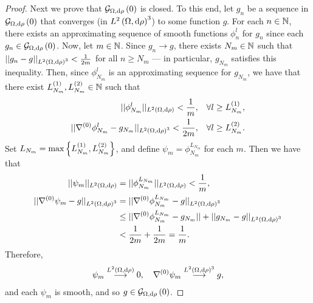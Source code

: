 \begin{proof}
	Next we prove that $\mathcal{G}_{ \Omega, \mathrm{d}\rho}\left( 0 \right)$ is closed.
	To this end, let $g_n$ be a sequence in $\mathcal{G}_{ \Omega, \mathrm{d}\rho}\left( 0 \right)$ that converges (in $L^{2}\left( \Omega,\mathrm{d}\rho \right)^3$) to some function $g$.
	For each $n\in\mathbb{N}$, there exists an approximating sequence of smooth functions $\phi_n^l$ for $g_n$ since each $g_n\in\mathcal{G}_{ \Omega, \mathrm{d}\rho}\left( 0 \right)$.
	Now, let $m\in\mathbb{N}$.
	Since $g_n\rightarrow g$, there exists $N_m\in\mathbb{N}$ such that $\lvert\lvert g_n-g \rvert\rvert_{L^{2}\left( \Omega,\mathrm{d}\rho \right)^3}<\frac{1}{2m}$ for all $n\geq N_m$ --- in particular, $g_{N_m}$ satisfies this inequality.
	Then, since $\phi_{N_m}^l$ is an approximating sequence for $g_{N_m}$, we have that there exist $L_{N_m}^{(1)}, L_{N_m}^{(2)}\in\mathbb{N}$ such that
	\begin{align*}
		\lvert\lvert \phi_{N_m}^l \rvert\rvert_{L^{2}\left( \Omega,\mathrm{d}\rho \right)} < \frac{1}{m}, &\quad\forall l\geq L_{N_m}^{(1)}, \\
		\lvert\lvert \nabla^{(0)}\phi_{N_m}^l - g_{N_m} \rvert\rvert_{L^{2}\left( \Omega,\mathrm{d}\rho \right)^3} < \frac{1}{2m}, &\quad\forall l\geq L_{N_m}^{(2)}.
	\end{align*}	 
	Set $L_{N_m} = \max\left\{  L_{N_m}^{(1)}, L_{N_m}^{(2)}  \right\}$, and define $\psi_m = \phi^{L_{N_m}}_{N_m}$ for each $m$.
	Then we have that
	\begin{align*}
		\lvert\lvert \psi_m \rvert\rvert_{L^{2}\left( \Omega,\mathrm{d}\rho \right)} &= \lvert\lvert \phi_{N_m}^{L_{N_m}} \rvert\rvert_{L^{2}\left( \Omega,\mathrm{d}\rho \right)} < \frac{1}{m}, \\
		\lvert\lvert \nabla^{(0)}\psi_m - g \rvert\rvert_{L^{2}\left( \Omega,\mathrm{d}\rho \right)^3} &= \lvert\lvert \nabla^{(0)}\phi_{N_m}^{L_{N_m}} - g \rvert\rvert_{L^{2}\left( \Omega,\mathrm{d}\rho \right)^3} \\
		&\leq \lvert\lvert \nabla^{(0)}\phi_{N_m}^{L_{N_m}} - g_{N_m} \rvert\rvert + \lvert\lvert g_{N_m} - g \rvert\rvert_{L^{2}\left( \Omega,\mathrm{d}\rho \right)^3} \\
		&< \frac{1}{2m} + \frac{1}{2m} = \frac{1}{m}.
	\end{align*}
	Therefore,
	\begin{align*}
		\psi_m \overset{L^{2}\left( \Omega,\mathrm{d}\rho \right)}{\longrightarrow} 0, \quad \nabla^{(0)}\psi_m \overset{L^{2}\left( \Omega,\mathrm{d}\rho \right)^3}{\longrightarrow} g,
	\end{align*}
	and each $\psi_m$ is smooth, and so $g\in\mathcal{G}_{ \Omega, \mathrm{d}\rho}\left( 0 \right)$.
\end{proof}

